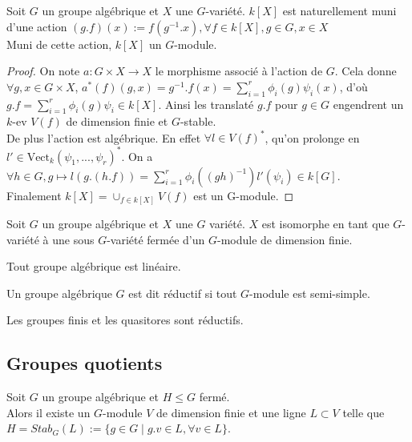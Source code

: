 \begin{prop}
Soit $G$ un groupe algébrique et $X$ une $G$-variété. $k[X]$ est naturellement muni d'une action $(g.f)(x):=f(g^{-1}.x), \forall f\in k[X], g\in G,x\in X$\\
Muni de cette action, $k[X]$ un $G$-module.
\end{prop}
\begin{proof}
On note $a:G\times X\rightarrow X$ le morphisme associé à l'action de $G$. Cela donne $\forall g,x \in G\times X$, $a^*(f)(g,x)=g^{-1}.f(x)=\sum_{i=1}^r\phi_i(g)\psi_i(x)$, d'où $g.f=\sum_{i=1}^r\phi_i(g)\psi_i\in k[X]$. Ainsi les translaté $g.f$ pour $g\in G$ engendrent un $k$-ev $V(f)$ de dimension finie et $G$-stable. \\
De plus l'action est algébrique. En effet $\forall l\in V(f)^*$, qu'on prolonge en $l'\in \textrm{Vect}_k(\psi_1,...,\psi_r)^*$. On a $\forall h\in G, g\mapsto l(g.(h.f))=\sum_{i=1}^r\phi_i((gh)^{-1})l'(\psi_i)\in k[G]$.\\
Finalement $k[X]=\cup_{f\in k[X]}V(f)$ est un G-module.
\end{proof}

\begin{thm}\label{embed}
Soit $G$ un groupe algébrique et $X$ une $G$ variété. $X$ est isomorphe en tant que $G$-variété à une sous $G$-variété fermée d'un $G$-module de dimension finie.
\end{thm}

\begin{cor}
Tout groupe algébrique est linéaire.
\end{cor}

\begin{defn}
Un groupe algébrique $G$ est dit réductif si tout $G$-module est semi-simple.
\end{defn}

\begin{ex}
Les groupes finis et les quasitores sont réductifs.
\end{ex}

\subsection{Groupes quotients}
\begin{thm}
Soit $G$ un groupe algébrique et $H\leq G$ fermé. \\Alors il existe un $G$-module $V$ de dimension finie et une ligne $L\subset V$ telle que $H=Stab_G(L):=\lbrace g\in G\mid g.v\in L,\forall v\in L\rbrace$.
\end{thm}

